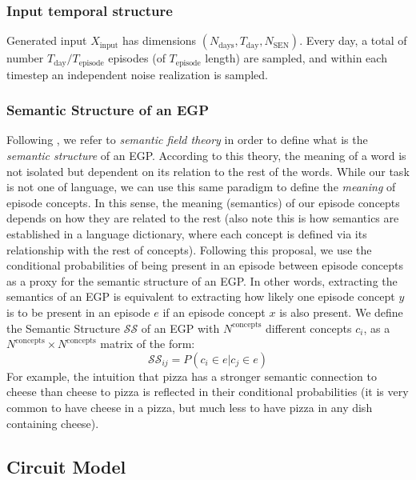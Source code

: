 \documentclass{article}
\begin{document}
\subsubsection*{Input temporal structure}
Generated input $X_\textrm{input}$ has dimensions $(N_\textrm{days}, T_\textrm{day}, N_\textrm{SEN})$. Every day, a total of number $T_\textrm{day}/T_\textrm{episode}$ episodes (of $T_\textrm{episode}$ length) are sampled, and within each timestep an independent noise realization is sampled. 
\subsubsection*{Semantic Structure of an EGP}
Following , we refer to  \textit{semantic field theory}  in order to define what is the \textit{semantic structure} of an EGP. According to this theory, the meaning of a word is not isolated but dependent on its relation to the rest of the words. While our task is not one of language, we can use this same paradigm to define the \textit{meaning} of episode concepts. In this sense, the meaning (semantics) of our episode concepts depends on how they are related to the rest (also note this is how semantics are established in a language dictionary, where each concept is defined via its relationship with the rest of concepts). 
\newline\newline
Following this proposal, we use the conditional probabilities of being present in an episode between episode concepts as a proxy for the semantic structure of an EGP. In other words, extracting the semantics of an EGP is equivalent to extracting how likely one episode concept $y$ is to be present in an episode $e$ if an episode concept $x$ is also present. We define the Semantic Structure $\mathcal{SS}$ of an EGP with $N^\textrm{concepts}$ different concepts $c_i$, as a $N^\textrm{concepts}\times N^\textrm{concepts}$ matrix of the form:
\begin{equation}
    \mathcal{SS}_{ij} = P(c_i \in e|c_j \in e) 
    \label{eq:semantic_structure}
\end{equation}
For example, the intuition that pizza has a stronger semantic connection to cheese than cheese to pizza is reflected in their conditional probabilities (it is very common to have cheese in a pizza, but much less to have pizza in any dish containing cheese).  
\subsection*{Circuit Model}
\end{document}
